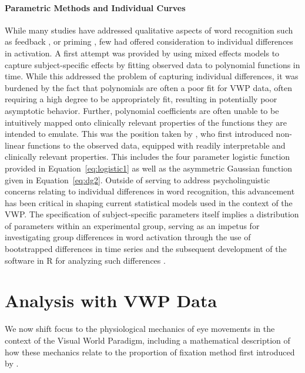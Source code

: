 \paragraph{Parametric Methods and Individual Curves} While many studies have addressed qualitative aspects of word recognition such as feedback \citep{Magnuson2003}, or priming \citep{luce1998delayed}, few had offered consideration to individual differences in activation. A first attempt was provided by \citet{Mirman2008} using mixed effects models to capture subject-specific effects by fitting observed data to polynomial functions in time. While this addressed the problem of capturing individual differences, it was burdened by the fact that polynomials are often a poor fit for VWP data, often requiring a high degree to be appropriately fit, resulting in potentially poor asymptotic behavior. Further, polynomial coefficients are often unable to be intuitively mapped onto clinically relevant properties of the functions they are intended to emulate. This was the position taken by \citet{mcmurray2010individual}, who first introduced non-linear functions to the observed data, equipped with readily interpretable and clinically relevant properties. This includes the four parameter logistic function provided in Equation~\ref{eq:logistic1} as well as the asymmetric Gaussian function given in Equation~\ref{eq:dg2}. Outside of serving to address psycholinguistic concerns relating to individual differences in word recognition, this advancement has been critical in shaping current statistical models used in the context of the VWP. The specification of subject-specific parameters itself implies a distribution of parameters within an experimental group, serving as an impetus for investigating group differences in word activation through the use of bootstrapped differences in time series \citep{oleson2017detecting} and the subsequent development of the  software in R for analyzing such differences \citep{seedorff2018bdots}.



\section{Analysis with VWP Data}

We now shift focus to the physiological mechanics of eye movements in the context of the Visual World Paradigm, including a mathematical description of how these mechanics relate to the proportion of fixation method first introduced by \citet{allopenna1998tracking}.  




